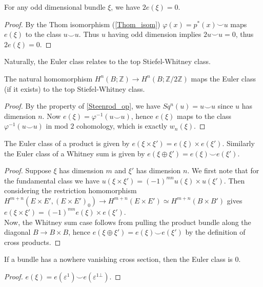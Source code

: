 	\begin{coro}
		For any odd dimensional bundle $\xi$, we have $2e(\xi)=0$. 
	\end{coro}
	\begin{proof}
		By the Thom isomorphism (\cref{Thom_isom}) $\varphi(x)=p^*(x)\smile u$ maps $e(\xi)$ to the class $u\smile u$. Thus $u$ having odd dimension implies $2u\smile u=0$, thus $2e(\xi)=0$. 
	\end{proof}

	Naturally, the Euler class relates to the top Stiefel-Whitney class. 
	\begin{prop}
		The natural homomorphism $H^n(B;\mathbb{Z})\to H^n(B;\mathbb{Z}/2\mathbb{Z})$ maps the Euler class (if it exists) to the top Stiefel-Whitney class. 
	\end{prop}
	\begin{proof}
		By the property of \cref{Steenrod_op}, we have $Sq^n(u)=u\smile u$ since $u$ has dimension $n$. Now $e(\xi)=\varphi^{-1}(u\smile u)$, hence $e(\xi)$ maps to the class $\varphi^{-1}(u\smile u)$ in mod $2$ cohomology, which is exactly $w_n(\xi)$. 
	\end{proof}

	\begin{prop}\label{Euler_prod}
		The Euler class of a product is given by $e(\xi\times\xi')=e(\xi)\times e(\xi')$. Similarly the Euler class of a Whitney sum is given by $e(\xi\oplus\xi')=e(\xi)\smile e(\xi')$. 
	\end{prop}
	\begin{proof}
		Suppose $\xi$ has dimension $m$ and $\xi'$ has dimension $n$. We first note that for the fundamental class we have $u(\xi\times\xi')=(-1)^{mn}u(\xi)\times u(\xi')$. Then considering the restriction homomorphism $H^{m+n}(E\times E',(E\times E')_0)\to H^{m+n}(E\times E')\simeq H^{m+n}(B\times B')$ gives $e(\xi\times\xi')=(-1)^{mn}e(\xi)\times e(\xi')$. \\
		Now, the Whitney sum case follows from pulling the product bundle along the diagonal $B\to B\times B$, hence $e(\xi\oplus\xi')=e(\xi)\smile e(\xi')$ by the definition of cross products. 
	\end{proof}

	\begin{coro}
		If a bundle has a nowhere vanishing cross section, then the Euler class is $0$. 
	\end{coro}
	\begin{proof}
		$e(\xi)=e(\varepsilon^1)\smile e(\varepsilon^{1\bot})$. 
	\end{proof}


